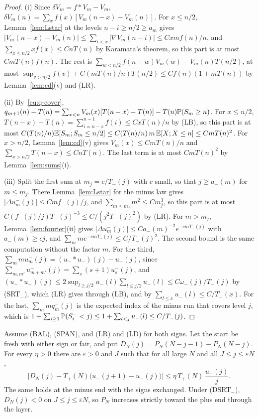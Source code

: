 \begin{proof}
(i) Since $\delta V_m=f*V_m-V_m$, $\delta V_m(n)=\sum_xf(x)[V_m(n-x)-V_m(n)]$. For $x\le n/2$,
Lemma~\ref{lem:Lstar} at the levels $n-i\ge n/2\ge a_m$ gives
$|V_m(n-x)-V_m(n)|\le\sum_{i<x}|\nabla V_m(n-i)|\le Cxmf(n)/n$, and $\sum_{x\le n/2}xf(x)\le CnT(n)$ by
Karamata's theorem, so this part is at most $CmT(n)f(n)$. The rest is
$\sum_{w<n/2}f(n-w)V_m(w)-V_m(n)T(n/2)$, at most $\sup_{v>n/2}f(v)+C(mT(n)/n)T(n/2)\le Cf(n)(1+mT(n))$ by
Lemma~\ref{lem:cd}(v) and (LR).

(ii) By~\eqref{eq:q-cover}, $q_{m+1}(n)-T(n)=\sum_{x<n}V_m(x)[T(n-x)-T(n)]-T(n)\mathbb{P}(S_m\ge n)$. For
$x\le n/2$, $T(n-x)-T(n)=\sum_{i=n-x}^{n-1}f(i)\le CxT(n)/n$ by (LB), so this part is at most
$C(T(n)/n)\mathbb{E}[S_m;S_m\le n/2]\le C(T(n)/n)\,m\,\mathbb{E}[X;X\le n]\le CmT(n)^2$. For $x>n/2$,
Lemma~\ref{lem:cd}(v) gives $V_m(x)\le CmT(n)/n$ and $\sum_{x>n/2}T(n-x)\le CnT(n)$. The last term is
at most $CmT(n)^2$ by Lemma~\ref{lem:sums}(i).

(iii) Split the first sum at $m_j=c/T_\minus(j)$ with $c$ small, so that $j\ge a_\minus(m)$ for
$m\le m_j$. There Lemma~\ref{lem:Lstar} for the minus law gives $|\Delta u^\minus_m(j)|\le Cmf_\minus(j)/j$,
and $\sum_{m\le m_j}m^2\le Cm_j^3$, so this part is at most $C(f_\minus(j)/j)T_\minus(j)^{-3}\le C/(j^2T_\minus(j)^2)$
by (LR). For $m>m_j$, Lemma~\ref{lem:fourier}(ii) gives $|\Delta u^\minus_m(j)|\le Ca_\minus(m)^{-2}e^{-cmT_\minus(j)}$
with $a_\minus(m)\ge cj$, and $\sum_mme^{-cmT_\minus(j)}\le C/T_\minus(j)^2$. The second bound is the
same computation without the factor $m$. For the third, $\sum_mmu^\minus_m(j)=(u_\minus*u_\minus)(j)-u_\minus(j)$,
since $\sum_{m,m'}u^\minus_{m+m'}(j)=\sum_s(s+1)u^\minus_s(j)$, and
$(u_\minus*u_\minus)(j)\le2\sup_{l\ge j/2}u_\minus(l)\sum_{l\le j/2}u_\minus(l)\le C\omega_\minus(j)/T_\minus(j)$
by (SRT$_\minus$), which (LR) gives through (LB), and by $\sum_{l\le x}u_\minus(l)\le C/T_\minus(x)$. For
the last, $\sum_mmq^\minus_m(j)$ is the expected index of the minus run that covers level $j$, which
is $1+\sum_{i\ge1}\mathbb{P}(S^{-}_i<j)\le1+\sum_{l<j}u_{-}(l)\le C/T_{-}(j)$.
\end{proof}

\begin{theorem}\label{thm:layer-diff}
Assume (BAL), (SPAN), and (LR) and (LD) for both signs. Let the start be fresh with either sign or
fair, and put $D_N(j)=P_N(N-j-1)-P_N(N-j)$. For every $\eta>0$ there are $\varepsilon>0$ and $J$ such
that for all large $N$ and all $J\le j\le\varepsilon N$,
\[
 \bigl|D_N(j)-T_\plus(N)\bigl(u_\minus(j+1)-u_\minus(j)\bigr)\bigr|\le\eta\,T_\plus(N)\,\frac{u_\minus(j)}j .
\]
The same holds at the minus end with the signs exchanged. Under (DSRT$_\minus$), $D_N(j)<0$ on
$J\le j\le\varepsilon N$, so $P_N$ increases strictly toward the plus end through the layer.
\end{theorem}

